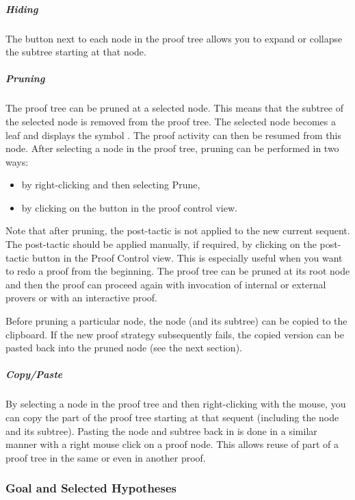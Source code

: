 \subparagraph{Hiding}

The button next to each node in the proof tree allows you to expand or collapse the subtree starting at that node. 

\subparagraph{Pruning}

The proof tree can be pruned at a selected node. This means that the subtree of the selected node is removed from the proof tree. The selected node becomes a leaf and displays the symbol . The proof activity can then be resumed from this node. After selecting a node in the proof tree, pruning can be performed in two ways:

\begin{itemize}
	\item by right-clicking and then selecting \textsf{Prune},
	\item by clicking on the  button in the proof control view. 
\end{itemize}

Note that after pruning, the post-tactic is not applied to the new current sequent. The post-tactic should be applied manually, if required, by clicking on the post-tactic button in the Proof Control view. This is especially useful when you want to redo a proof from the beginning. The proof tree can be pruned at its root node and then the proof can proceed again with invocation of internal or external provers or with an interactive proof.

Before pruning a particular node, the node (and its subtree) can be copied to the clipboard. If the new proof strategy subsequently fails, the copied version can be pasted back into the pruned node (see the next section). 

\subparagraph{Copy/Paste}

By selecting a node in the proof tree and then right-clicking with the mouse, you can copy the part of the proof tree starting at that sequent (including the node and its subtree). Pasting the node and subtree back in is done in a similar manner with a right mouse click on a proof node. This allows reuse of part of a proof tree in the same or even in another proof.

\subsubsection{Goal and Selected Hypotheses}
\label{goal_view}


